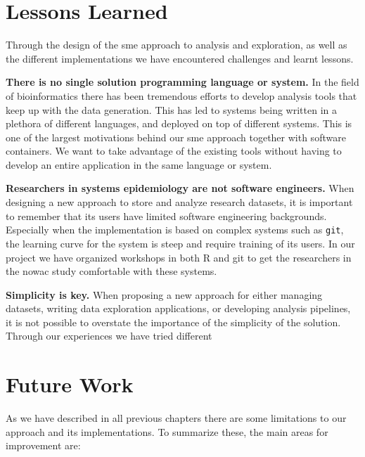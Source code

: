 \section{Lessons Learned}
Through the design of the \gls{sme} approach to analysis and exploration, as
well as the different implementations we have encountered challenges and
learnt lessons.  

\textbf{There is no single solution programming language or system.} In the
field of bioinformatics there has been tremendous efforts to develop analysis
tools that keep up with the data generation. This has led to systems being
written in a plethora of different languages, and deployed on top of different
systems.  This is one of the largest motivations behind our \gls{sme} approach
together with software containers. We want to take advantage of the existing
tools without having to develop an entire application in the same language or
system.

\textbf{Researchers in systems epidemiology are not software engineers.} When
designing a new approach to store and analyze research datasets, it is important
to remember that its users have limited software engineering backgrounds.
Especially when the implementation is based on complex systems such as
\texttt{git}, the learning curve for the system is steep and require training of
its users. In our project we have organized workshops in both R and git to get
the researchers in the \gls{nowac} study comfortable with these systems. 

\textbf{Simplicity is key.} When proposing a new approach for either managing
datasets, writing data exploration applications, or developing analysis
pipelines, it is not possible to overstate the importance of the simplicity of
the solution. Through our experiences we have tried different 




\section{Future Work}
As we have described in all previous chapters there are some limitations to our
approach and its implementations. To summarize these, the main areas for
improvement are: 

